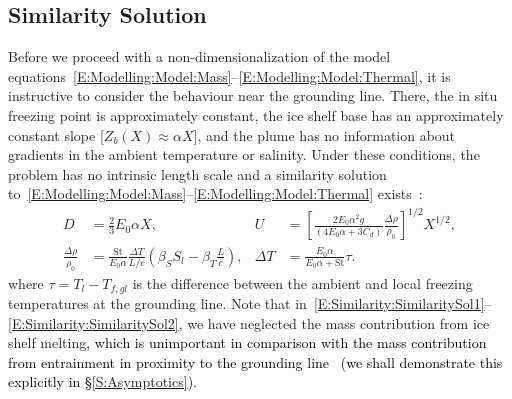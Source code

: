 \documentclass[openacc]{rsproca_new}%
\newcommand{\red}[1]{{\color{red} #1}}
\newcommand{\blue}[1]{{\color{blue} #1}}
\newcommand{\rout}[1]{\red{\st{#1}}}\newcommand{\ab}[1]{\textcolor{Green}{#1}}\newcommand{\about}[1]{\textcolor{Cyan}{\sout{#1}}}
\renewcommand{\rout}[1]{{}} %
\renewcommand{\blue}[1]{{\textcolor{black}{#1}}} %
\renewcommand{\red}[1]{{}} %
\begin{document}
\subsection{Similarity Solution}\label{S:Model:SimilaritySolution}
Before we proceed with a non-dimensionalization of the model equations~\eqref{E:Modelling:Model:Mass}--\eqref{E:Modelling:Model:Thermal}, it is instructive to consider the behaviour near the grounding line. There, the in situ freezing point is approximately constant, the ice shelf base has an approximately constant slope [$Z_b(X) \approx \alpha X$], and the plume has no information about gradients in the ambient temperature or salinity. Under these conditions, the problem has no intrinsic length scale and a similarity solution to~\eqref{E:Modelling:Model:Mass}--\eqref{E:Modelling:Model:Thermal} exists~\cite{Magorrian2016JGeoResOcean}:
\begin{align}
D &= \frac{2}{3}E_0 \alpha X, & U &= \left[\frac{2E_0 \alpha^2 g}{\left(4E_0 \alpha + 3 C_d\right)} \frac{\Delta \rho}{\rho_0}\right]^{1/2}X^{1/2},\label{E:Similarity:SimilaritySol1}\\
 \frac{\Delta \rho}{\rho_0} &= \frac{\mathrm{St}}{E_0 \alpha}\frac{\Delta T}{L/c}\left(\beta_S S_l - \beta_T \frac{L}{c}\right), & \Delta T &= \frac{E_0 \alpha}{E_0 \alpha + \mathrm{St}}\tau.\label{E:Similarity:SimilaritySol2}
\end{align}
where $\tau = T_l - T_{f,gl}$ is the difference between the ambient and local freezing temperatures at the grounding line. Note that in~\eqref{E:Similarity:SimilaritySol1}--\eqref{E:Similarity:SimilaritySol2}, we have neglected the mass contribution from ice shelf melting\blue{, which is unimportant in comparison with the mass contribution from entrainment in proximity to the grounding line~\cite{Hewitt2020AnnRevFlu}}\rout{;} \blue{(we shall demonstrate this explicitly in \S\ref{S:Asymptotics}).} \rout{ that this is reasonable for locations close to the grounding line.}
\end{document}
